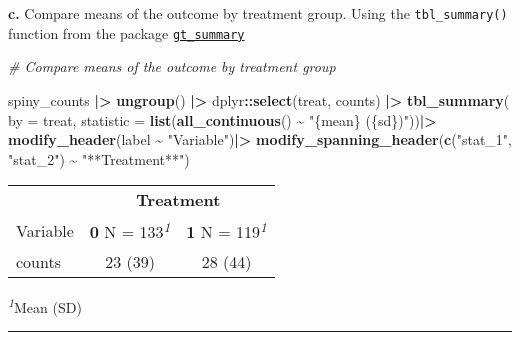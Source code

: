 \documentclass[
]{article}
\newenvironment{Shaded}{\begin{snugshade}}{\end{snugshade}}
\newcommand{\AttributeTok}[1]{\textcolor[rgb]{0.13,0.29,0.53}{#1}}
\newcommand{\CommentTok}[1]{\textcolor[rgb]{0.56,0.35,0.01}{\textit{#1}}}
\newcommand{\FunctionTok}[1]{\textcolor[rgb]{0.13,0.29,0.53}{\textbf{#1}}}
\newcommand{\NormalTok}[1]{#1}
\newcommand{\SpecialCharTok}[1]{\textcolor[rgb]{0.81,0.36,0.00}{\textbf{#1}}}
\newcommand{\StringTok}[1]{\textcolor[rgb]{0.31,0.60,0.02}{#1}}
\begin{document}
\textbf{c.} Compare means of the outcome by treatment group. Using the
\texttt{tbl\_summary()} function from the package
\href{https://www.danieldsjoberg.com/gtsummary/articles/tbl_summary.html}{\texttt{gt\_summary}}

\begin{Shaded}
\begin{Highlighting}[]
\CommentTok{\# Compare means of the outcome by treatment group}

\NormalTok{spiny\_counts }\SpecialCharTok{|\textgreater{}} 
    \FunctionTok{ungroup}\NormalTok{() }\SpecialCharTok{|\textgreater{}}
\NormalTok{    dplyr}\SpecialCharTok{::}\FunctionTok{select}\NormalTok{(treat, counts) }\SpecialCharTok{|\textgreater{}}
    \FunctionTok{tbl\_summary}\NormalTok{(}
        \AttributeTok{by =}\NormalTok{ treat,}
        \AttributeTok{statistic =} \FunctionTok{list}\NormalTok{(}\FunctionTok{all\_continuous}\NormalTok{() }\SpecialCharTok{\textasciitilde{}} \StringTok{"\{mean\} (\{sd\})"}\NormalTok{))}\SpecialCharTok{|\textgreater{}}
    \FunctionTok{modify\_header}\NormalTok{(label }\SpecialCharTok{\textasciitilde{}} \StringTok{"Variable"}\NormalTok{)}\SpecialCharTok{|\textgreater{}}
    \FunctionTok{modify\_spanning\_header}\NormalTok{(}\FunctionTok{c}\NormalTok{(}\StringTok{"stat\_1"}\NormalTok{, }\StringTok{"stat\_2"}\NormalTok{) }\SpecialCharTok{\textasciitilde{}} \StringTok{"**Treatment**"}\NormalTok{)}
\end{Highlighting}
\end{Shaded}

\begin{table}[!t]
\fontsize{12.0pt}{14.4pt}\selectfont
\begin{tabular*}{\linewidth}{@{\extracolsep{\fill}}lcc}
\toprule
 & \multicolumn{2}{c}{\textbf{Treatment}} \\ 
\cmidrule(lr){2-3}
Variable & \textbf{0}  N = 133\textsuperscript{\textit{1}} & \textbf{1}  N = 119\textsuperscript{\textit{1}} \\ 
\midrule\addlinespace[2.5pt]
counts & 23 (39) & 28 (44) \\ 
\bottomrule
\end{tabular*}
\begin{minipage}{\linewidth}
\textsuperscript{\textit{1}}Mean (SD)\\
\end{minipage}
\end{table}

\begin{center}\rule{0.5\linewidth}{0.5pt}\end{center}
\end{document}
